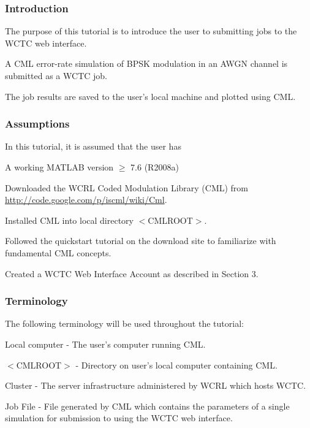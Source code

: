 
\begin{frame}
  \frametitle{Introduction}
\begin{itemize_loose}
\item The purpose of this tutorial is to introduce the user to submitting jobs to the WCTC web interface.

\item A CML error-rate simulation of BPSK modulation in an AWGN channel is submitted as a WCTC job.

\item The job results are saved to the user's local machine and plotted using CML.
\end{itemize_loose}

\end{frame}


\begin{frame}
\frametitle{Assumptions}
In this tutorial, it is assumed that the user has
\begin{itemize_loose}
\item A working MATLAB version $\geq$ 7.6 (R2008a)
\item Downloaded the WCRL Coded Modulation Library (CML) from \url{http://code.google.com/p/iscml/wiki/Cml}.
\item Installed CML into local directory $<$CMLROOT$>$.
\item Followed the quickstart tutorial on the download site to familiarize with fundamental CML concepts.
\item Created a WCTC Web Interface Account as described in Section 3.
\end{itemize_loose}

\end{frame}

\begin{frame}
\frametitle{Terminology}
The following terminology will be used throughout the tutorial:
\begin{itemize_loose}
\item Local computer - The user's computer running CML.
\item $<$CMLROOT$>$ - Directory on user's local computer containing CML.
\item Cluster - The server infrastructure administered by WCRL which hosts WCTC.
\item Job File - File generated by CML which contains the parameters of a single simulation for submission to using the WCTC web interface.
\end{itemize_loose}
\end{frame}


